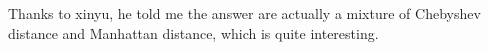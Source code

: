\documentclass[12pt]{article}
\begin{document}
\begin{center}
\end{center}

Thanks to xinyu, he told me the answer are actually a mixture of Chebyshev distance and Manhattan distance, which is quite interesting.
\end{document}
